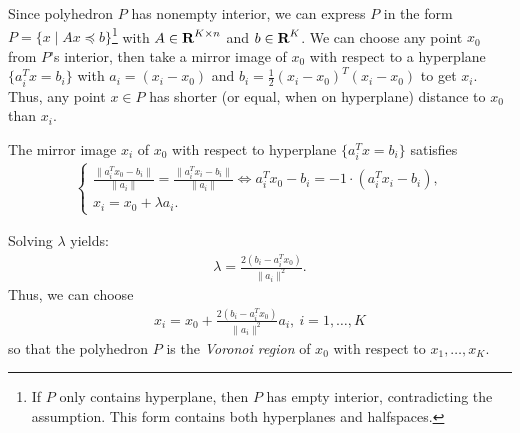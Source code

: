 \documentclass[12pt]{article}
\begin{document}
\begin{solution}[2.9(b)]

	Since polyhedron $P$ has nonempty interior, we can express $P$ in the form $P=\{ x \mid Ax \preceq b\}$\footnote{If $P$ only contains hyperplane, then $P$ has empty interior, contradicting the assumption. This form contains both hyperplanes and halfspaces.} with $A \in {\mbox{\bf R}}^{K\times n} $ and $b\in {\mbox{\bf R}}^{K} $.
	We can choose any point $x_0$ from $P$'s interior, then take a mirror image of $x_0$ with respect to a hyperplane $\{a_i^T x = b_i\}$ with $a_{i} = (x_{i}-x_0)$ and $b_{i} = \frac{1}{2}(x_i-x_0)^T(x_i-x_0)$ to get $x_{i}$.
	Thus, any point $x\in P$ has shorter (or equal, when on hyperplane) distance to $x_0$ than $x_{i}$.

	The mirror image $x_{i}$ of $x_0$ with respect to hyperplane $\{a_i^T x = b_i\}$ satisfies
	\begin{align*}
		\begin{cases}
		\frac{\|a_{i}^{T} x_0-b_{i}\|}{\|a_{i}\|} =	\frac{\|a_{i}^{T} x_i-b_{i}\|}{\|a_{i}\|} \Longleftrightarrow a_{i}^{T} x_0-b_{i} = -1\cdot(a_{i}^{T} x_i-b_{i}), \\
x_{i} = x_0 + \lambda a_{i}.
		\end{cases}
	\end{align*}

	Solving $\lambda$ yields:
	\begin{align*}
		\lambda = \frac{2(b_{i}-a_{i}^Tx_0)}{\|a_{i}\|^2}
	.\end{align*}
	Thus, we can choose  
	\begin{align*}
		x_{i} = x_0 + \frac{2(b_{i}-a_{i}^Tx_0)}{\|a_{i}\|^2}a_{i},\ i = 1, \ldots, K
	\end{align*}
	so that the polyhedron $P$ is the \textit{Voronoi region} of $x_0$ with respect to $x_1,\ldots, x_{K}$.

\end{solution}
\end{document}
